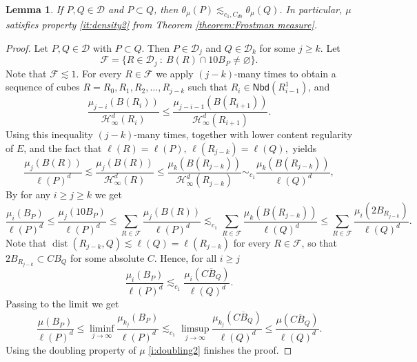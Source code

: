 \documentclass[11pt,reqno]{amsart}
\def\dF{{\mathcal{F}}}
\def\dist{\mathop\mathrm{dist}} 						%
\newcommand{\fr}[2]{\frac{#1}{#2}}
\newtheorem{lemma}[theorem]{Lemma}
\theoremstyle{definition}
\theoremstyle{remark}
\numberwithin{equation}{section}
\newcommand{\dD}{\mathcal{D}}
\newcommand{\DD}{\mathcal{D}}
\newcommand{\Nei}{\mathsf{Nbd}}
\theoremstyle{theorem}
\theoremstyle{definition}
\theoremstyle{remark}
\numberwithin{equation}{section}
\begin{document}
\newcommand{\calH}{\mathcal{H}}
\newcommand{\calK}{\mathcal{K}}

\begin{lemma}
	If $P,Q\in\DD$ and $P\subset Q$, then $\theta_\mu(P)\lesssim_{c_1,C_{db}}\theta_\mu(Q)$. In particular, $\mu$ satisfies property \eqref{it:density2} from Theorem \ref{theorem:Frostman measure}.
\end{lemma}
\begin{proof}
	Let $P, Q \in \dD$ with $P \subset Q$. Then $P \in \dD_{j}$ and $Q \in \dD_{k}$ for some $j\ge k$. Let 
	\begin{equation*}
	\dF = \{ R\in\DD_j\ :\ B(R)\cap 10B_P\neq\varnothing \}.
	\end{equation*}
	Note that $\dF\lesssim 1$. For every $R\in\dF$ we apply  $(j-k)$-many times to obtain a sequence of cubes $R=R_0, R_1, R_2,\dots, R_{j-k}$ such that $R_i\in \Nei(R_{i-1}^1)$, and 
	\begin{equation*}
	\frac{\mu_{j-i}(B(R_i))}{\calH^d_\infty(R_i)}\le \frac{\mu_{j-i-1}(B(R_{i+1}))}{\calH^d_\infty(R_{i+1})}.
	\end{equation*}
	Using this inequality $(j-k)$-many times, together with lower content regularity of $E$, and the fact that $\ell(R)=\ell(P),\, \ell(R_{j-k})=\ell(Q),$ yields
	\begin{equation*}
	\frac{\mu_{j}(B(R))}{\ell(P)^d}\lesssim \frac{\mu_{j}(B(R))}{\calH^d_\infty(R)} \le \frac{\mu_{k}(B(R_{j-k}))}{\calH^d_\infty(R_{j-k})}\sim_{c_1} \frac{\mu_{k}(B(R_{j-k}))}{\ell(Q)^d},
	\end{equation*}
	By  for any $i\ge j\ge k$ we get
	\begin{equation*}
	\fr{\mu_i(B_P)}{\ell(P)^d}\le \fr{\mu_j(10 B_P)}{\ell(P)^d} \le \sum_{R\in\dF}\frac{\mu_{j}(B(R))}{\ell(P)^d} \lesssim_{c_1} \sum_{R\in\dF} \frac{\mu_{k}(B(R_{j-k}))}{\ell(Q)^d} \le \sum_{R\in\dF} \frac{\mu_{i}(2B_{R_{j-k}})}{\ell(Q)^d}.
	\end{equation*}	
	Note that $\dist(R_{j-k},Q)\lesssim \ell(Q) = \ell(R_{j-k})$ for every $R\in\dF$, so that $2B_{R_{j-k}}\subset CB_Q$ for some absolute $C$. Hence, for all $i\ge j$
	\begin{equation*}
	\fr{\mu_i(B_P)}{\ell(P)^d} \lesssim_{c_1} \frac{\mu_{i}(\overline{CB_{Q}})}{\ell(Q)^d}.
	\end{equation*}
	Passing to the limit we get
	\begin{equation*}
	\fr{\mu(B_P)}{\ell(P)^d} \le \liminf_{j \to \infty} \fr{\mu_{k_j}(B_P)}{\ell(P)^d} \lesssim_{c_1} \limsup_{j \to \infty} \frac{\mu_{k_j}(\overline{CB_{Q}})}{\ell(Q)^d} \le \frac{\mu(\overline{CB_{Q}})}{\ell(Q)^d}.
	\end{equation*}
	Using the doubling property of $\mu$ \eqref{i:doubling2} finishes the proof.
\end{proof}
\end{document}

